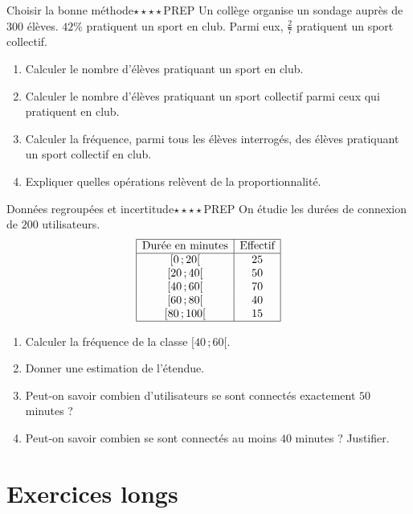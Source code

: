 \documentclass[11pt,a4paper]{article}
\newcommand{\classe}[2]{\ensuremath{[#1\,;#2[}}
\newcounter{exo}
\begin{document}
\begin{exobox}{Choisir la bonne méthode}{$\star\star\star\star$}{PREP}
Un collège organise un sondage auprès de $300$ élèves. $42\%$ pratiquent un sport en club. Parmi eux, $\frac{2}{7}$ pratiquent un sport collectif.
\begin{enumerate}
\item Calculer le nombre d'élèves pratiquant un sport en club.
\item Calculer le nombre d'élèves pratiquant un sport collectif parmi ceux qui pratiquent en club.
\item Calculer la fréquence, parmi tous les élèves interrogés, des élèves pratiquant un sport collectif en club.
\item Expliquer quelles opérations relèvent de la proportionnalité.
\end{enumerate}
\end{exobox}

\begin{exobox}{Données regroupées et incertitude}{$\star\star\star\star$}{PREP}
On étudie les durées de connexion de $200$ utilisateurs.
\[
\begin{array}{|c|c|}
\hline
\text{Durée en minutes} & \text{Effectif} \\
\hline
\classe{0}{20} & 25 \\
\classe{20}{40} & 50 \\
\classe{40}{60} & 70 \\
\classe{60}{80} & 40 \\
\classe{80}{100} & 15 \\
\hline
\end{array}
\]
\begin{enumerate}
\item Calculer la fréquence de la classe \classe{40}{60}.
\item Donner une estimation de l'étendue.
\item Peut-on savoir combien d'utilisateurs se sont connectés exactement $50$ minutes ?
\item Peut-on savoir combien se sont connectés au moins $40$ minutes ? Justifier.
\end{enumerate}
\end{exobox}

\section{Exercices longs}
\end{document}
